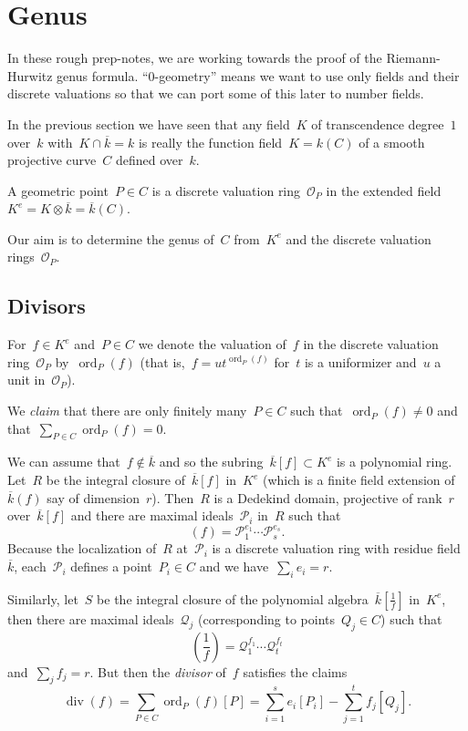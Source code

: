 \section{Genus}
In these rough prep-notes, we are working towards the proof of the Riemann-Hurwitz genus formula. ``0-geometry'' means we want to use only fields and their discrete valuations so that we can port some of this later to number fields.

In the previous section we have seen that any field~$K$ of transcendence degree~$1$ over~$k$ with~$K \cap \overline{k} = k$ is really the function field~$K = k(C)$ of a smooth projective curve~$C$ defined over~$k$.

A geometric point~$P \in C$ is a discrete valuation ring~$\mathcal{O}_P$ in the extended field~$K^e = K \otimes \overline{k} = \overline{k}(C)$.

Our aim is to determine the genus of~$C$ from~$K^e$ and the discrete valuation rings~$\mathcal{O}_P$.

\subsection{Divisors}
For~$f \in K^e$ and~$P \in C$ we denote the valuation of~$f$ in the discrete valuation ring~$\mathcal{O}_P$ by~$\operatorname{ord}_P(f)$ (that is,~$f = u t^{\operatorname{ord}_P(f)}$ for~$t$ is a uniformizer and~$u$ a unit in~$\mathcal{O}_P$). 

We \emph{claim} that there are only finitely many~$P \in C$ such that~$\operatorname{ord}_P(f) \not= 0$ and that~$\sum_{P \in C} \operatorname{ord}_P(f) = 0$.

We can assume that~$f \notin \overline{k}$ and so the subring~$\overline{k}[f] \subset K^e$ is a polynomial ring. Let~$R$ be the integral closure of~$\overline{k}[f]$ in~$K^e$ (which is a finite field extension of~$\overline{k}(f)$ say of dimension~$r$). Then~$R$ is a Dedekind domain, projective of rank~$r$ over~$\overline{k}[f]$ and there are maximal ideals~$\mathcal{P}_i$ in~$R$ such that
\begin{equation}
  (f) = \mathcal{P}_1^{e_1} \cdots \mathcal{P}_s^{e_s}.
\end{equation}
Because the localization of~$R$ at~$\mathcal{P}_i$ is a discrete valuation ring with residue field~$\overline{k}$, each~$\mathcal{P}_i$ defines a point~$P_i \in C$ and we have~$\sum_i e_i = r$.

Similarly, let~$S$ be the integral closure of the polynomial algebra~$\overline{k}[\frac{1}{f}]$ in~$K^e$, then there are maximal ideals~$\mathcal{Q}_j$ (corresponding to points~$Q_j \in C$) such that
\begin{equation}
  \left(\frac{1}{f}\right) = \mathcal{Q}_1^{f_1} \cdots \mathcal{Q}_t^{f_t}
\end{equation}
and~$\sum_j f_j = r$. But then the \emph{divisor} of~$f$ satisfies the claims
\begin{equation}
  \operatorname{div}(f) = \sum_{P \in C} \operatorname{ord}_P(f) [P] = \sum_{i=1}^s e_i [P_i] - \sum_{j=1}^t f_j [Q_j].
\end{equation}


